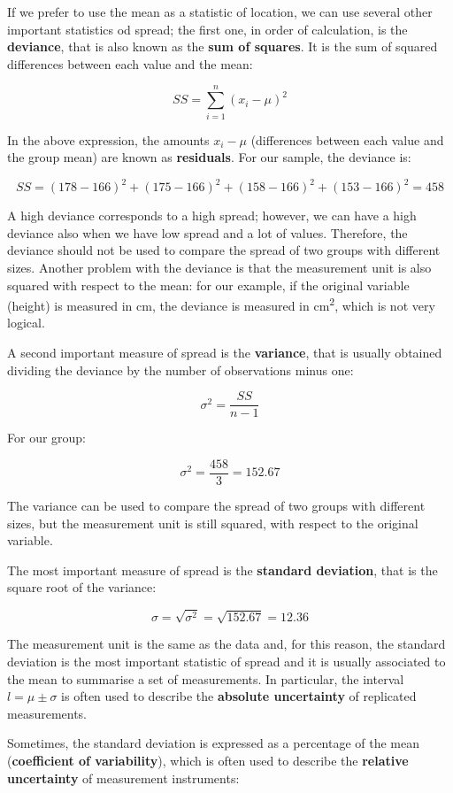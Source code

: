 \documentclass[a4paper,12pt,oneside]{book}
\begin{document}
If we prefer to use the mean as a statistic of location, we can use several other important statistics od spread; the first one, in order of calculation, is the \textbf{deviance}, that is also known as the \textbf{sum of squares}. It is the sum of squared differences between each value and the mean:

\[SS = \sum\limits_{i = 1}^n {(x_i  - \mu)^2 }\]

In the above expression, the amounts \(x_i - \mu\) (differences between each value and the group mean) are known as \textbf{residuals}. For our sample, the deviance is:

\[SS = \left(178 - 166 \right)^2 + \left(175 - 166 \right)^2 + \left(158 - 166 \right)^2  + \left(153 - 166 \right)^2= 458\]

A high deviance corresponds to a high spread; however, we can have a high deviance also when we have low spread and a lot of values. Therefore, the deviance should not be used to compare the spread of two groups with different sizes. Another problem with the deviance is that the measurement unit is also squared with respect to the mean: for our example, if the original variable (height) is measured in cm, the deviance is measured in cm\textsuperscript{2}, which is not very logical.

A second important measure of spread is the \textbf{variance}, that is usually obtained dividing the deviance by the number of observations minus one:

\[\sigma^2  = \frac{SS}{n - 1}\]

For our group:

\[\sigma^2  = \frac{458}{3} = 152.67\]

The variance can be used to compare the spread of two groups with different sizes, but the measurement unit is still squared, with respect to the original variable.

The most important measure of spread is the \textbf{standard deviation}, that is the square root of the variance:

\[\sigma = \sqrt{\sigma^2} = \sqrt{152.67} = 12.36\]

The measurement unit is the same as the data and, for this reason, the standard deviation is the most important statistic of spread and it is usually associated to the mean to summarise a set of measurements. In particular, the interval \(l = \mu \pm \sigma\) is often used to describe the \textbf{absolute uncertainty} of replicated measurements.

Sometimes, the standard deviation is expressed as a percentage of the mean (\textbf{coefficient of variability}), which is often used to describe the \textbf{relative uncertainty} of measurement instruments:
\end{document}
